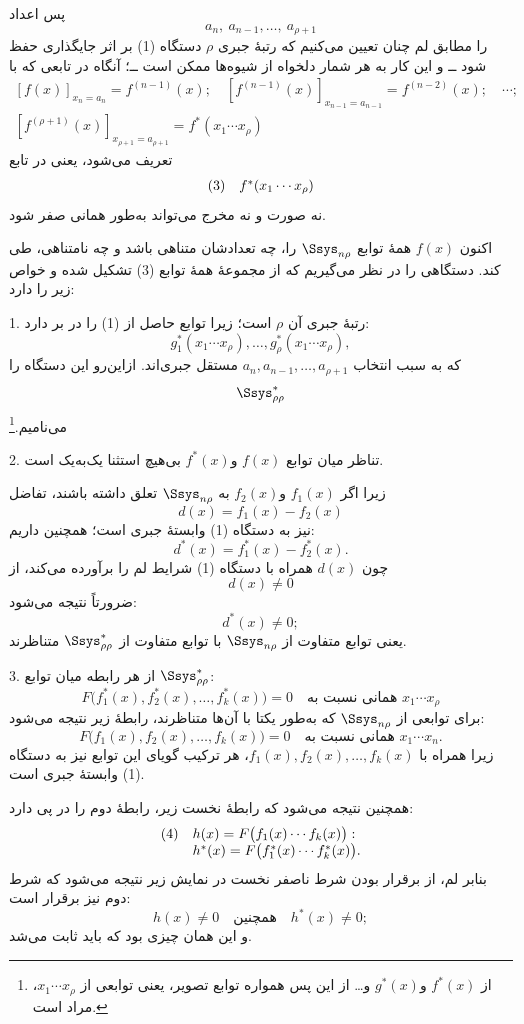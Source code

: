 \documentclass[11pt]{article}
\newcommand{\srcLTR}[1]{\relax\ifmmode\text{\mbox{\babelsublr{\foreignlanguage{english}{#1}}}}\else\babelsublr{\foreignlanguage{english}{#1}}\fi}
\newcommand{\srcfn}[2]{\begingroup\renewcommand{\thefootnote}{\srcLTR{#1}}\footnote{#2}\addtocounter{footnote}{-1}\endgroup}
\begin{document}
پس اعداد
\[
 a_n,\ a_{n-1},\ldots,\ a_{\rho+1}
\]
را مطابق لم چنان تعیین می‌کنیم که رتبهٔ جبری $\rho$ دستگاه (1) بر اثر جایگذاری حفظ شود ــ و این کار به هر شمار دلخواه از شیوه‌ها ممکن است ــ؛ آنگاه در تابعی که با
\[
\begin{array}{c}
[f(x)]_{x_n=a_n}=f^{(n-1)}(x);\quad
[f^{(n-1)}(x)]_{x_{n-1}=a_{n-1}}=f^{(n-2)}(x);\quad\cdots;\\[0.25em]
[f^{(\rho+1)}(x)]_{x_{\rho+1}=a_{\rho+1}}=f^*(x_1\cdots x_\rho)
\end{array}
\]
تعریف می‌شود، یعنی در تابع
\[
\begin{array}{@{}l@{\quad}c@{}}
(3)& f^*(x_1\cdots x_\rho)
\end{array}
\]
نه صورت و نه مخرج می‌تواند به‌طور همانی صفر شود.

اکنون $f(x)$ همهٔ توابع $\Ssys_{n\rho}$ را، چه تعدادشان متناهی باشد و چه نامتناهی، طی کند. دستگاهی را در نظر می‌گیریم که از مجموعهٔ همهٔ توابع (3) تشکیل شده و خواص زیر را دارد:

1. رتبهٔ جبری آن $\rho$ است؛ زیرا توابع حاصل از (1) را در بر دارد:
\[
g_1^*(x_1\cdots x_\rho),\ldots,g_\rho^*(x_1\cdots x_\rho),
\]
که به سبب انتخاب $a_n,a_{n-1},\ldots,a_{\rho+1}$ مستقل جبری‌اند. ازاین‌رو این دستگاه را
\[
\Ssys^*_{\rho\rho}
\]
می‌نامیم.\srcfn{**)}{از $f^*(x)$ و$g^*(x)$ و\ldots{} از این پس همواره توابع تصویر، یعنی توابعی از $x_1\cdots x_\rho$، مراد است.}

2. تناظر میان توابع $f(x)$ و$f^*(x)$ بی‌هیچ استثنا یک‌به‌یک است.

زیرا اگر $f_1(x)$ و$f_2(x)$ به $\Ssys_{n\rho}$ تعلق داشته باشند، تفاضل
\[
d(x)=f_1(x)-f_2(x)
\]
نیز به دستگاه (1) وابستهٔ جبری است؛ همچنین داریم:
\[
d^*(x)=f_1^*(x)-f_2^*(x).
\]
چون $d(x)$ همراه با دستگاه (1) شرایط لم را برآورده می‌کند، از
\[
d(x)\ne0
\]
ضرورتاً نتیجه می‌شود:
\[
d^*(x)\ne0;
\]
یعنی توابع متفاوت از $\Ssys_{n\rho}$ با توابع متفاوت از $\Ssys^*_{\rho\rho}$ متناظرند.

3. از هر رابطه میان توابع $\Ssys^*_{\rho\rho}$:
\[
F\bigl(f_1^*(x),f_2^*(x),\ldots,f_k^*(x)\bigr)=0
\quad\text{همانی نسبت به }x_1\cdots x_\rho
\]
برای توابعی از $\Ssys_{n\rho}$ که به‌طور یکتا با آن‌ها متناظرند، رابطهٔ زیر نتیجه می‌شود:
\[
F\bigl(f_1(x),f_2(x),\ldots,f_k(x)\bigr)=0
\quad\text{همانی نسبت به }x_1\cdots x_n.
\]
زیرا همراه با $f_1(x),f_2(x),\ldots,f_k(x)$، هر ترکیب گویای این توابع نیز به دستگاه (1) وابستهٔ جبری است.

همچنین نتیجه می‌شود که رابطهٔ نخست زیر، رابطهٔ دوم را در پی دارد:
\[
\begin{array}{@{}l@{\quad}l@{}}
(4)& h(x)=F\bigl(f_1(x)\cdots f_k(x)\bigr):\\
& h^*(x)=F\bigl(f_1^*(x)\cdots f_k^*(x)\bigr).
\end{array}
\]
بنابر لم، از برقرار بودن شرط ناصفر نخست در نمایش زیر نتیجه می‌شود که شرط دوم نیز برقرار است:
\[
h(x)\ne0\quad\text{همچنین}\quad h^*(x)\ne0;
\]
و این همان چیزی بود که باید ثابت می‌شد.
\end{document}

